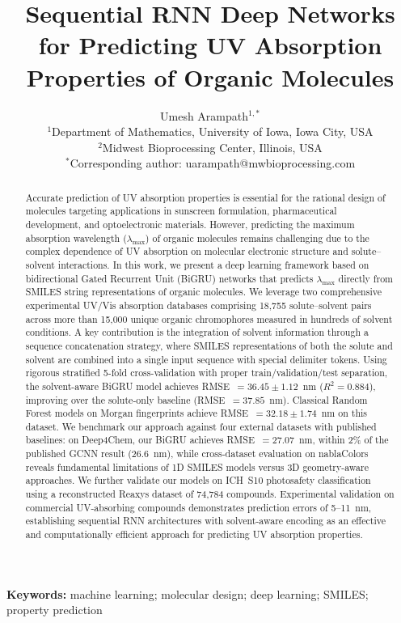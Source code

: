 \documentclass[11pt,a4paper]{article}
\title{Sequential RNN Deep Networks for Predicting UV Absorption Properties of Organic Molecules}
\author{
    Umesh Arampath$^{1,*}$ \\[0.5em]
    \small $^1$Department of Mathematics, University of Iowa, Iowa City, USA \\
    \small $^2$Midwest Bioprocessing Center, Illinois, USA \\[0.3em]
    \small $^*$Corresponding author: uarampath@mwbioprocessing.com
}
\date{}
\begin{document}
\maketitle

\begin{abstract}
Accurate prediction of UV absorption properties is essential for the rational design of molecules
targeting applications in sunscreen formulation, pharmaceutical development, and optoelectronic
materials. However, predicting the maximum absorption wavelength ($\lambda_{\max}$) of organic
molecules remains challenging due to the complex dependence of UV absorption on molecular
electronic structure and solute--solvent interactions. In this work, we present a deep learning
framework based on bidirectional Gated Recurrent Unit (BiGRU) networks that predicts
$\lambda_{\max}$ directly from SMILES string representations of organic molecules. We leverage
two comprehensive experimental UV/Vis absorption databases comprising 18,755
solute--solvent pairs across more than 15,000 unique organic chromophores measured in hundreds of solvent
conditions. A key contribution is the integration
of solvent information through a sequence concatenation strategy,
where SMILES representations of both the solute and solvent are combined into a single input
sequence with special delimiter tokens. Using rigorous stratified 5-fold cross-validation with proper train/validation/test separation, the solvent-aware BiGRU model achieves RMSE~$= 36.45 \pm 1.12$~nm ($R^2 = 0.884$), improving over the solute-only baseline (RMSE~$= 37.85$~nm). Classical Random Forest models on Morgan fingerprints achieve RMSE~$= 32.18 \pm 1.74$~nm on this dataset. We benchmark our approach against four external datasets with published baselines: on Deep4Chem, our BiGRU achieves RMSE~$= 27.07$~nm, within 2\% of the published GCNN result (26.6~nm), while cross-dataset evaluation on nablaColors reveals fundamental limitations of 1D SMILES models versus 3D geometry-aware approaches. We further validate our models on ICH~S10 photosafety classification using a reconstructed Reaxys dataset of 74,784 compounds. Experimental validation on commercial UV-absorbing compounds demonstrates prediction errors of 5--11~nm, establishing sequential RNN architectures with solvent-aware encoding as an effective and
computationally efficient approach for predicting UV absorption properties.
\end{abstract}

\noindent\textbf{Keywords:} machine learning; molecular design; deep learning; SMILES; property prediction
\end{document}
